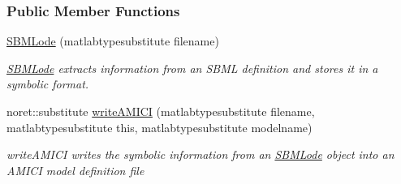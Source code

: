 \subsubsection*{Public Member Functions}
\begin{DoxyCompactItemize}
\item 
\hyperlink{class_s_b_m_lode_a2cd0d930d07eaf96753131799d7bdc9c}{S\+B\+M\+Lode} (matlabtypesubstitute filename)
\begin{DoxyCompactList}\small\item\em \hyperlink{class_s_b_m_lode}{S\+B\+M\+Lode} extracts information from an S\+B\+M\+L definition and stores it in a symbolic format. \end{DoxyCompactList}\item 
noret\+::substitute \hyperlink{class_s_b_m_lode_acec53dca9922c09c88e57eb531571c07}{write\+A\+M\+I\+C\+I} (matlabtypesubstitute filename, matlabtypesubstitute this, matlabtypesubstitute modelname)
\begin{DoxyCompactList}\small\item\em write\+A\+M\+I\+C\+I writes the symbolic information from an \hyperlink{class_s_b_m_lode}{S\+B\+M\+Lode} object into an A\+M\+I\+C\+I model definition file \end{DoxyCompactList}\end{DoxyCompactItemize}

